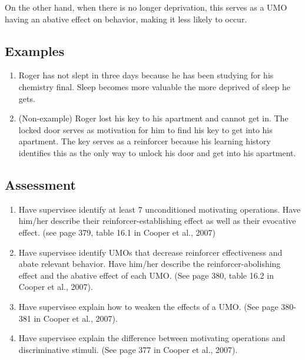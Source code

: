 On the other hand, when there is no longer deprivation, this serves as a UMO having an abative effect on behavior, making it less likely to occur.
%
\subsection{Examples}
\begin{enumerate}
\item Roger has not slept in three days because he has been studying for his chemistry final. Sleep becomes more valuable the more deprived of sleep he gets. 
\item (Non-example) Roger lost his key to his apartment and cannot get in. The locked door serves as motivation for him to find his key to get into his apartment. The key serves as a reinforcer because his learning history identifies this as the only way to unlock his door and get into his apartment.
%
\end{enumerate}
%
\subsection{Assessment}
\begin{enumerate}
\item Have supervisee identify at least 7 unconditioned motivating operations. Have him/her describe their reinforcer-establishing effect as well as their evocative effect. (see page 379, table 16.1 in Cooper et al., 2007)
\item Have supervisee identify UMOs that decrease reinforcer effectiveness and abate relevant behavior. Have him/her describe the reinforcer-abolishing effect and the abative effect of each UMO. (See page 380, table 16.2 in Cooper et al., 2007).
\item Have supervisee explain how to weaken the effects of a UMO. (See page 380-381 in Cooper et al., 2007).
\item Have supervisee explain the difference between motivating operations and discriminative stimuli. (See page 377 in Cooper et al., 2007).
%
\end{enumerate}
%
